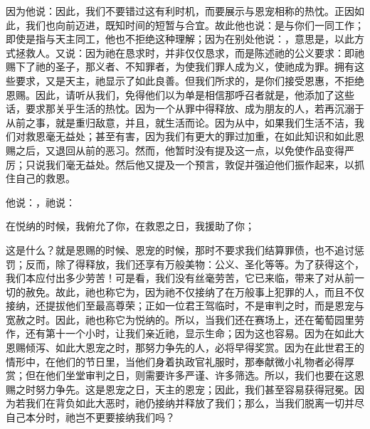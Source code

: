 因为他说：因此，我们不要错过这有利时机，而要展示与恩宠相称的热忱。正因如此，我们也向前迈进，既知时间的短暂与合宜。故此他也说：是与你们一同工作；即使是指与天主同工，他也不拒绝这种理解；因为在别处他说：，意思是，以此方式拯救人。又说：因为祂在恳求时，并非仅仅恳求，而是陈述祂的公义要求：即祂赐下了祂的圣子，那义者、不知罪者，为使我们罪人成为义，使祂成为罪。拥有这些要求，又是天主，祂显示了如此良善。但我们所求的，是你们接受恩惠，不拒绝恩赐。因此，请听从我们，免得他们以为单是相信那呼召者就是，他添加了这些话，要求那关乎生活的热忱。因为一个从罪中得释放、成为朋友的人，若再沉溺于从前之事，就是重归敌意，并且，就生活而论。因为从中，如果我们生活不洁，我们对救恩毫无益处；甚至有害，因为我们有更大的罪过加重，在如此知识和如此恩赐之后，又退回从前的恶习。然而，他暂时没有提及这一点，以免使作品变得严厉；只说我们毫无益处。然后他又提及一个预言，敦促并强迫他们振作起来，以抓住自己的救恩。\par

他说：，祂说：\par

在悦纳的时候，我俯允了你，\newline{}在救恩之日，我援助了你；\newline{}\par

这是什么？就是恩赐的时候、恩宠的时候，那时不要求我们结算罪债，也不追讨惩罚；反而，除了得释放，我们还享有万般美物：公义、圣化等等。为了获得这个，我们本应付出多少劳苦！可是看，我们没有丝毫劳苦，它已来临，带来了对从前一切的赦免。故此，祂也称它为，因为祂不仅接纳了在万般事上犯罪的人，而且不仅接纳，还提拔他们至最高尊荣；正如一位君王驾临时，不是审判之时，而是恩宠与宽赦之时。因此，祂也称它为悦纳的。所以，当我们还在赛场上，还在葡萄园里劳作，还有第十一个小时，让我们亲近祂，显示生命；因为这也容易。因为在如此大恩赐倾泻、如此大恩宠之时，那努力争先的人，必将早得奖赏。因为在此世君王的情形中，在他们的节日里，当他们身着执政官礼服时，那奉献微小礼物者必得厚赏；但在他们坐堂审判之日，则需要许多严谨、许多筛选。所以，我们也要在这恩赐之时努力争先。这是恩宠之日，天主的恩宠；因此，我们甚至容易获得冠冕。因为若我们在背负如此大恶时，祂仍接纳并释放了我们；那么，当我们脱离一切并尽自己本分时，祂岂不更要接纳我们吗？\par

